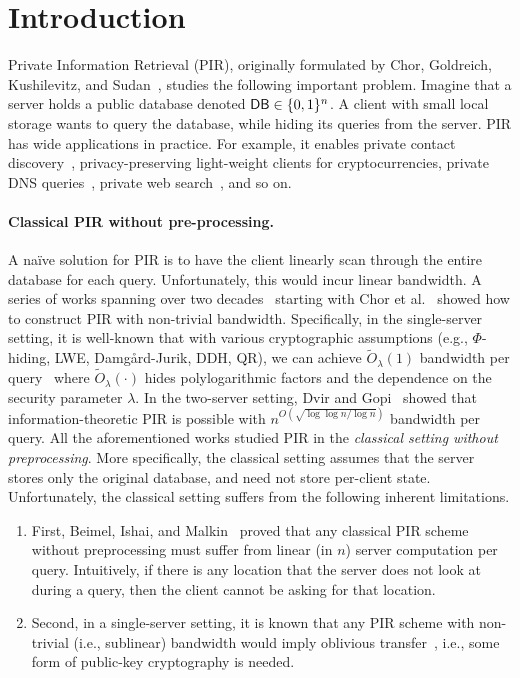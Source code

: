 \section{Introduction}

Private Information Retrieval (PIR),  
originally formulated by Chor, 
Goldreich, Kushilevitz, and Sudan~\cite{pir00}, studies the following important problem.
Imagine that a server holds a public database denoted
${\mathsf{DB}}\in \{0, 1\}^n$.
A client with small local storage  
wants to query the database, while hiding 
its queries from the server. 
PIR has wide applications in practice. For example, 
it enables private contact discovery~\cite{pirpsi,Signalblog},
privacy-preserving light-weight clients for cryptocurrencies, 
private DNS queries~\cite{shi-pir,piano,obliviousdns}, 
private web search~\cite{tiptoe}, and so on. 

\paragraph{Classical PIR without pre-processing.}
A na\"ive solution for PIR is to have the client linearly 
scan through the entire database for each query.
Unfortunately, this would incur linear bandwidth. 
A series of works spanning over two decades~\cite{pir00,pir02,pir06,pir05,pir01,pir07,pir08,pir09,pir10,pir11,pir12,pir13,pir14,pir15} 
starting with Chor et al.~\cite{pir00} showed
how to construct PIR with non-trivial bandwidth. 
Specifically, in the single-server setting, it is well-known that 
with various cryptographic
assumptions (e.g., $\Phi$-hiding, LWE, Damg\r{a}rd-Jurik, DDH, QR), 
we can achieve $\widetilde{O}_\lambda(1)$ bandwidth 
per query~\cite{pir05,simplepir,spiral,tdh}
where $\widetilde{O}_\lambda(\cdot)$ hides  
polylogarithmic factors and the 
dependence on the security parameter $\lambda$.
In the two-server setting, 
Dvir and Gopi~\cite{dg16-pir} 
showed that information-theoretic PIR is possible with 
$n^{O(\sqrt{\log \log n /\log n})}$
bandwidth per query.
All the aforementioned 
works studied PIR in the {\it classical setting without preprocessing}. 
More specifically, the classical setting assumes that the server
stores only the original database, and need  
not store per-client state.
Unfortunately, the classical setting 
suffers from the following inherent limitations. 
\begin{enumerate}[leftmargin=5mm]
\item 
First, Beimel, Ishai, and Malkin~\cite{bim-pir}
proved that any classical PIR scheme without preprocessing 
must suffer from 
linear (in $n$) server computation per query. 
Intuitively, if there is any location that the server does not look
at during a query, then the client cannot be asking for that location.
\item 
Second, in a single-server setting, it is known
that any PIR scheme with non-trivial (i.e., sublinear) bandwidth would imply
oblivious transfer~\cite{pirot}, 
i.e., some form of public-key cryptography is needed. 
\end{enumerate}

